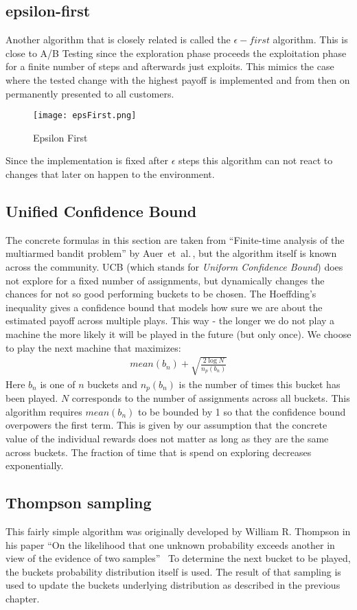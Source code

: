 \documentclass[main.tex]{subfiles}
\begin{document}
\subsection{epsilon-first}
Another algorithm that is closely related is called the $\epsilon-first$ algorithm. This is close to A/B Testing since the exploration phase proceeds the exploitation phase for a finite number of steps and afterwards just exploits. This mimics the case where the tested change with the highest payoff is implemented and from then on permanently presented to all customers.
\begin{figure}[ht]
\texttt{[image: epsFirst.png]}
\centering
\caption{Epsilon First}
\label{fig:EpsiFir}
\end{figure}
Since the implementation is fixed after $\epsilon$ steps this algorithm can not react to changes that later on happen to the environment.

\subsection{Unified Confidence Bound}
The concrete formulas in this section are taken from ``Finite-time analysis of the multiarmed bandit problem'' by Auer~et~al.\,\cite{auer2002finite}, but the algorithm itself is known across the community. UCB (which stands for \emph{Uniform Confidence Bound}) does not explore for a fixed number of assignments, but dynamically changes the chances for not so good performing buckets to be chosen. The Hoeffding's inequality gives a confidence bound that models how sure we are about the estimated payoff across multiple plays. This way - the longer we do not play a machine the more likely it will be played in the future (but only once). We choose to play the next machine that maximizes:
\begin{align*}
mean(b_n) + \sqrt{\frac{2\log{N}}{n_p(b_n)}}
\end{align*}
Here $b_n$ is one of $n$ buckets and $n_p(b_n)$ is the number of times this bucket has been played. $N$ corresponds to the number of assignments across all buckets. This algorithm requires $mean(b_n)$ to be bounded by 1 so that the confidence bound overpowers the first term. This is given by our assumption that the concrete value of the individual rewards does not matter as long as they are the same across buckets. The fraction of time that is spend on exploring decreases exponentially.


\subsection{Thompson sampling}
This fairly simple algorithm was originally developed by William R. Thompson in his paper ``On the likelihood that one unknown probability exceeds another in view of the evidence of two samples''~\cite{thompson1933likelihood} To determine the next bucket to be played, the buckets probability distribution itself is used. The result of that sampling is used to update the buckets underlying distribution as described in the previous chapter.
\end{document}
